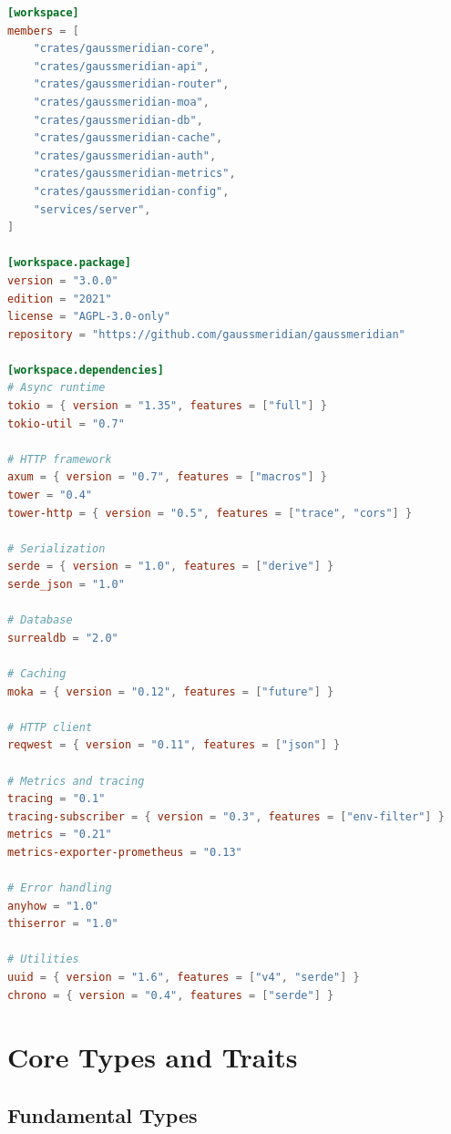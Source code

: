 \documentclass[12pt,a4paper,twoside]{report}
\begin{document}
\begin{lstlisting}[language=toml,caption={Workspace Configuration}]
[workspace]
members = [
    "crates/gaussmeridian-core",
    "crates/gaussmeridian-api",
    "crates/gaussmeridian-router",
    "crates/gaussmeridian-moa",
    "crates/gaussmeridian-db",
    "crates/gaussmeridian-cache",
    "crates/gaussmeridian-auth",
    "crates/gaussmeridian-metrics",
    "crates/gaussmeridian-config",
    "services/server",
]

[workspace.package]
version = "3.0.0"
edition = "2021"
license = "AGPL-3.0-only"
repository = "https://github.com/gaussmeridian/gaussmeridian"

[workspace.dependencies]
# Async runtime
tokio = { version = "1.35", features = ["full"] }
tokio-util = "0.7"

# HTTP framework
axum = { version = "0.7", features = ["macros"] }
tower = "0.4"
tower-http = { version = "0.5", features = ["trace", "cors"] }

# Serialization
serde = { version = "1.0", features = ["derive"] }
serde_json = "1.0"

# Database
surrealdb = "2.0"

# Caching
moka = { version = "0.12", features = ["future"] }

# HTTP client
reqwest = { version = "0.11", features = ["json"] }

# Metrics and tracing
tracing = "0.1"
tracing-subscriber = { version = "0.3", features = ["env-filter"] }
metrics = "0.21"
metrics-exporter-prometheus = "0.13"

# Error handling
anyhow = "1.0"
thiserror = "1.0"

# Utilities
uuid = { version = "1.6", features = ["v4", "serde"] }
chrono = { version = "0.4", features = ["serde"] }
\end{lstlisting}

\section{Core Types and Traits}

\subsection{Fundamental Types}
\end{document}
